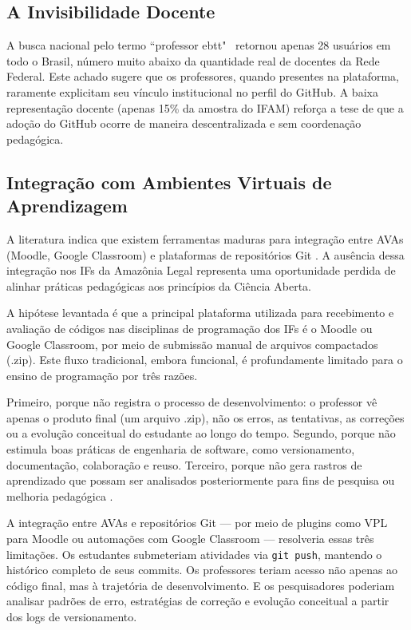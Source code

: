 \documentclass[english, spanish, brazilian]{RBIEarticle}
\begin{document}
\subsection{A Invisibilidade Docente}

A busca nacional pelo termo ``professor ebtt"~ retornou apenas 28 usuários em todo o Brasil, número muito abaixo da quantidade real de docentes da Rede Federal. Este achado sugere que os professores, quando presentes na plataforma, raramente explicitam seu vínculo institucional no perfil do GitHub. A baixa representação docente (apenas 15\% da amostra do IFAM) reforça a tese de que a adoção do GitHub ocorre de maneira descentralizada e sem coordenação pedagógica.

\subsection{Integração com Ambientes Virtuais de Aprendizagem}

A literatura indica que existem ferramentas maduras para integração entre AVAs (Moodle, Google Classroom) e plataformas de repositórios Git \cite{moodle2024, google2024}. A ausência dessa integração nos IFs da Amazônia Legal representa uma oportunidade perdida de alinhar práticas pedagógicas aos princípios da Ciência Aberta.

A hipótese levantada é que a principal plataforma utilizada para recebimento e avaliação de códigos nas disciplinas de programação dos IFs é o Moodle ou Google Classroom, por meio de submissão manual de arquivos compactados (.zip). Este fluxo tradicional, embora funcional, é profundamente limitado para o ensino de programação por três razões.

Primeiro, porque não registra o processo de desenvolvimento: o professor vê apenas o produto final (um arquivo .zip), não os erros, as tentativas, as correções ou a evolução conceitual do estudante ao longo do tempo. Segundo, porque não estimula boas práticas de engenharia de software, como versionamento, documentação, colaboração e reuso. Terceiro, porque não gera rastros de aprendizado que possam ser analisados posteriormente para fins de pesquisa ou melhoria pedagógica \cite{nascimento2026logs}.

A integração entre AVAs e repositórios Git — por meio de plugins como VPL para Moodle \cite{moodle2024} ou automações com Google Classroom \cite{google2024} — resolveria essas três limitações. Os estudantes submeteriam atividades via \texttt{git push}, mantendo o histórico completo de seus commits. Os professores teriam acesso não apenas ao código final, mas à trajetória de desenvolvimento. E os pesquisadores poderiam analisar padrões de erro, estratégias de correção e evolução conceitual a partir dos logs de versionamento.
\end{document}
